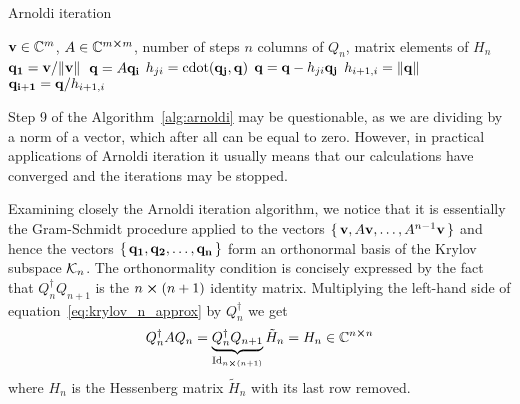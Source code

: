 \begin{algorithm}
	\algrenewcommand{}
	\algrenewcommand{}
	\caption{Arnoldi iteration}
	\label{alg:arnoldi}
	\begin{algorithmic}[1]
		\Require \(\vectorbold{v} \in \CC^m\), \(A \in \mathbb{C}^{m\cross m}\), number of steps \(n\)
		\Ensure columns of \(Q_n\), matrix elements of \(H_n\)
		\State \(\vectorbold{q_1} = \vectorbold{v}/\norm*{\vectorbold{v}}\) 
			\State \(\vectorbold{q} = A\vectorbold{q_i}\)
				\State \(h_{ji} = \mathrm{cdot}(\vectorbold{q_j},\vectorbold{q})\) 
				\State \(\vectorbold{q} = \vectorbold{q} - h_{ji}\vectorbold{q_j}\) 
			\EndFor
			\State \(h_{i+1,i} = \norm{\vectorbold{q}} \) 
			\State \(\vectorbold{q_{i+1}} = \vectorbold{q}/h_{i+1,i} \)
		\EndFor
	\end{algorithmic}
\end{algorithm}

Step 9 of the Algorithm~\ref{alg:arnoldi} may be questionable, as we are dividing by a norm of a vector, which
after all can be equal to zero. However, in practical applications of Arnoldi iteration it usually means
that our calculations have converged and the iterations may be stopped.


Examining closely the Arnoldi iteration algorithm, we notice that it is essentially the Gram-Schmidt
procedure applied to the vectors \(\{\,\vectorbold{v}, A\vectorbold{v},\ldots, A^{n-1}\vectorbold{v}\,\}\) and hence the 
vectors \(\{\,\vectorbold{q_1}, \vectorbold{q_2},\ldots,\vectorbold{q_n}\,\}\) form an orthonormal basis
of the Krylov subspace \(\mathcal{K}_{n}\). The orthonormality condition is concisely expressed by 
the fact that \(Q^{\dagger}_n Q_{n+1} \) is the \(n\cross (n+1)\) identity matrix. Multiplying the left-hand side of
equation~\eqref{eq:krylov_n_approx} by \(Q^{\dagger}_n\) we get
\begin{equation}
	Q^{\dagger}_n A Q_n = \underbrace{Q^{\dagger}_n Q_{n+1}}_{\mathrm{Id}_{n\cross(n+1)}}\tilde{H}_n = H_n \in \mathbb{C}^{n\cross n}
	\label{eq:hessenberg}
\end{equation}
where \(H_n\) is the Hessenberg matrix \(\tilde{H}_n\) with its last row removed. 

